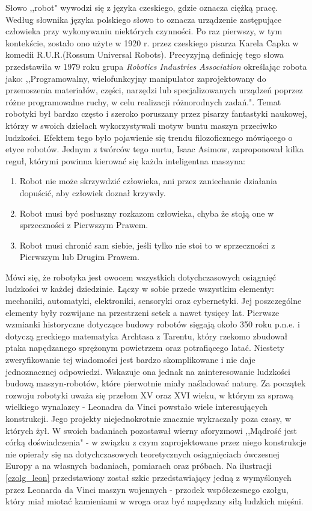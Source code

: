 Słowo ,,robot" wywodzi się z języka czeskiego, gdzie oznacza ciężką pracę. 
Według słownika języka polskiego słowo to oznacza urządzenie zastępujące człowieka przy wykonywaniu niektórych czynności\cite{SJP}. Po raz pierwszy, w tym kontekście, zostało ono użyte w 1920 r. przez czeskiego pisarza Karela \newtie{C}apka w komedii R.U.R.(Rossum Universal Robots)\cite{Czech}. Precyzyjną definicję tego słowa przedstawiła w 1979 roku grupa \textit{Robotics Industries Association} określając robota jako: ,,Programowalny, wielofunkcyjny manipulator zaprojektowany do przenoszenia materiałów, części, narzędzi lub specjalizowanych urządzeń poprzez różne programowalne ruchy, w celu realizacji różnorodnych zadań."\cite{def_robota}.
Temat robotyki był bardzo często i szeroko poruszany przez pisarzy fantastyki naukowej, którzy w swoich dziełach wykorzystywali motyw buntu maszyn przeciwko ludzkości. Efektem tego było pojawienie się trendu filozoficznego mówiącego o etyce robotów. Jednym z twórców tego nurtu, Isaac Asimow, zaproponował kilka reguł, którymi powinna kierować się każda inteligentna maszyna\cite{prawa_robota}:
\begin{enumerate}
\item Robot nie może skrzywdzić człowieka, ani przez zaniechanie działania dopuścić, aby człowiek doznał krzywdy.
\item Robot musi być posłuszny rozkazom człowieka, chyba że stoją one w sprzeczności z Pierwszym Prawem.
\item Robot musi chronić sam siebie, jeśli tylko nie stoi to w sprzeczności z Pierwszym lub Drugim Prawem.
\end{enumerate}
Mówi się, że robotyka jest owocem wszystkich dotychczasowych osiągnięć ludzkości w każdej dziedzinie. Łączy w sobie przede wszystkim elementy: mechaniki, automatyki, elektroniki, sensoryki oraz cybernetyki.
Jej poszczególne elementy były rozwijane na przestrzeni setek a nawet tysięcy lat. Pierwsze wzmianki historyczne dotyczące budowy robotów sięgają około 350 roku p.n.e. i dotyczą greckiego matematyka Archtasa z Tarentu, który rzekomo zbudował ptaka napędzanego sprężonym powietrzem oraz potrafiącego latać. Niestety  zweryfikowanie tej wiadomości jest bardzo skomplikowane i nie daje jednoznacznej odpowiedzi. Wskazuje ona jednak na zainteresowanie ludzkości budową maszyn-robotów, które pierwotnie miały naśladować naturę. Za początek rozwoju robotyki uważa się przełom XV oraz XVI wieku, w którym za sprawą wielkiego wynalazcy - Leonadra da Vinci powstało wiele interesujących konstrukcji. Jego projekty niejednokrotnie znacznie wykraczały poza czasy, w których żył. W swoich badaniach pozostawał wierny aforyzmowi ,,Mądrość jest
córką doświadczenia" - w związku z czym zaprojektowane przez niego konstrukcje nie opierały się na dotychczasowych teoretycznych osiągnięciach ówczesnej Europy a na własnych badaniach, pomiarach oraz próbach\cite{da_vinci}.  Na ilustracji \ref{czolg_leon} przedstawiony został szkic przedstawiający jedną z wymyślonych przez Leonarda da Vinci maszyn wojennych - przodek współczesnego czołgu, który miał miotać kamieniami w wroga oraz być napędzany siłą ludzkich mięśni.


